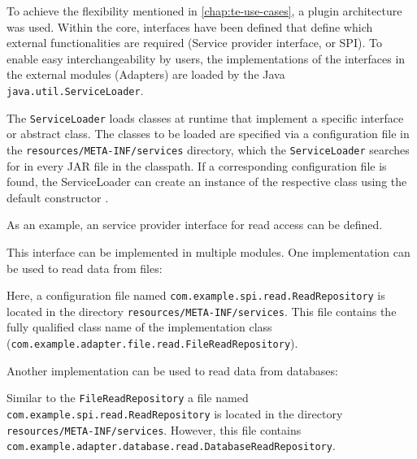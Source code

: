 To achieve the flexibility mentioned in \autoref{chap:te-use-cases}, a plugin architecture was used.
Within the core, interfaces have been defined that define which external functionalities are required (Service provider interface, or SPI).
To enable easy interchangeability by users, the implementations of the interfaces in the external modules (Adapters) are loaded by the Java \verb|java.util.ServiceLoader|.

The \verb|ServiceLoader| loads classes at runtime that implement a specific interface or abstract class.
The classes to be loaded are specified via a configuration file in the \verb|resources/META-INF/services| directory, which the \verb|ServiceLoader| searches for in every JAR file in the classpath.
If a corresponding configuration file is found, the ServiceLoader can create an instance of the respective class using the default constructor \cite{java-service-loader}.

As an example, an service provider interface for read access can be defined.



This interface can be implemented in multiple modules.
One implementation can be used to read data from files:



Here, a configuration file named \verb|com.example.spi.read.ReadRepository| is located in the directory \verb|resources/META-INF/services|.
This file contains the fully qualified class name of the implementation class \\(\verb|com.example.adapter.file.read.FileReadRepository|).

Another implementation can be used to read data from databases:



Similar to the \verb|FileReadRepository| a file named \\\verb|com.example.spi.read.ReadRepository| is located in the directory \\\verb|resources/META-INF/services|.
However, this file contains \\\verb|com.example.adapter.database.read.DatabaseReadRepository|.

